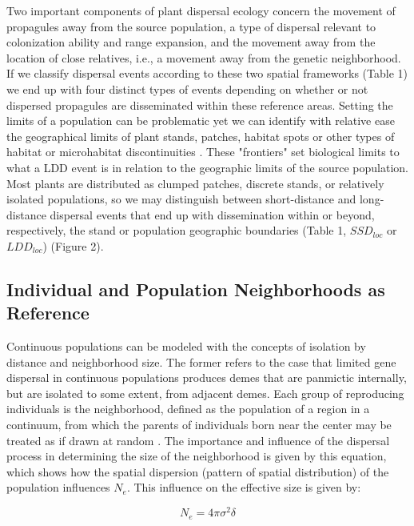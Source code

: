 \documentclass[a4paper, 12pt]{article}
\begin{document}
\begin{linenumbers}
Two important components of plant dispersal ecology concern the movement of propagules away from the source population, a type of dispersal relevant to colonization ability and range expansion, and the movement away from the location of close relatives, i.e., a movement away from the genetic neighborhood. If we classify dispersal events according to these two spatial frameworks (Table 1) we end up with four distinct types of events depending on whether or not dispersed propagules are disseminated within these reference areas. Setting the limits of a population can be problematic yet we can identify with relative ease the geographical limits of plant stands, patches, habitat spots or other types of habitat or microhabitat discontinuities \citep[see][for further discussion of boundaries for dispersal]{Kinlan:2005fb}. These "frontiers" set biological limits to what a LDD event is in relation to the geographic limits of the source population. Most plants are distributed as clumped patches, discrete stands, or relatively isolated populations, so we may distinguish between short-distance and long-distance dispersal events that end up with dissemination within or beyond, respectively, the stand or population geographic boundaries (Table 1, $SSD_{loc}$ or $LDD_{loc}$) (Figure 2).  

 


\subsection*{Individual and Population Neighborhoods as Reference}

Continuous populations can be modeled with the concepts of isolation by distance and neighborhood size\citep{Wright:1943aa,Wright:1946aa}. The former refers to the case that limited gene dispersal in continuous populations produces demes that are panmictic internally, but are isolated to some extent, from adjacent demes. Each group of reproducing individuals is the neighborhood, defined as the population of a region in a continuum, from which the parents of individuals born near the center may be treated as if drawn at random \citep{Wright:1969mb}. The importance and influence of the dispersal process in determining the size of the neighborhood is given by this equation, which shows how the spatial dispersion (pattern of spatial distribution) of the population influences $N_e$. This influence on the effective size is given by:

\begin{equation}
					N_e= 4 \pi \sigma^2 \delta
\end{equation}


\end{linenumbers}
\end{document}
